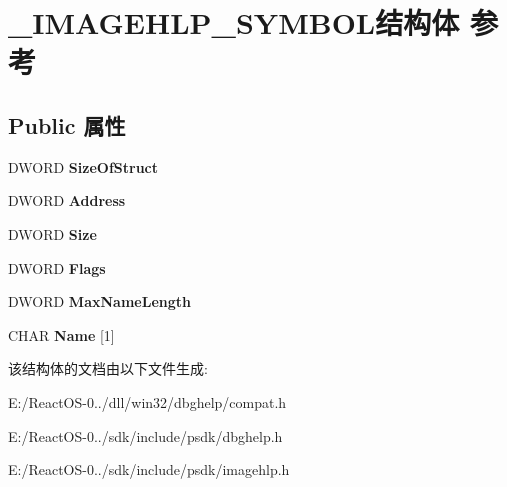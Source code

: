 \hypertarget{struct___i_m_a_g_e_h_l_p___s_y_m_b_o_l}{}\section{\+\_\+\+I\+M\+A\+G\+E\+H\+L\+P\+\_\+\+S\+Y\+M\+B\+O\+L结构体 参考}
\label{struct___i_m_a_g_e_h_l_p___s_y_m_b_o_l}
\subsection*{Public 属性}
\begin{DoxyCompactItemize}
\item 
\mbox{\label{struct___i_m_a_g_e_h_l_p___s_y_m_b_o_l_a34e4cee260d094b48f1c559def7e6b7d}} 
D\+W\+O\+RD {\bfseries Size\+Of\+Struct}
\item 
\mbox{\label{struct___i_m_a_g_e_h_l_p___s_y_m_b_o_l_a5c024291ea68d05b0ce732ef19c8dbb8}} 
D\+W\+O\+RD {\bfseries Address}
\item 
\mbox{\label{struct___i_m_a_g_e_h_l_p___s_y_m_b_o_l_a26bdc54ee7f6f31de76be163c3b78256}} 
D\+W\+O\+RD {\bfseries Size}
\item 
\mbox{\label{struct___i_m_a_g_e_h_l_p___s_y_m_b_o_l_ab5cc3cda6d865990ae9608ff4516ae09}} 
D\+W\+O\+RD {\bfseries Flags}
\item 
\mbox{\label{struct___i_m_a_g_e_h_l_p___s_y_m_b_o_l_a4dfe5c0638663f22e257e0802508b5f4}} 
D\+W\+O\+RD {\bfseries Max\+Name\+Length}
\item 
\mbox{\label{struct___i_m_a_g_e_h_l_p___s_y_m_b_o_l_af137ba810b2180056d4355ada787e002}} 
C\+H\+AR {\bfseries Name} \mbox{[}1\mbox{]}
\end{DoxyCompactItemize}


该结构体的文档由以下文件生成\+:\begin{DoxyCompactItemize}
\item 
E\+:/\+React\+O\+S-\/0../dll/win32/dbghelp/compat.\+h\item 
E\+:/\+React\+O\+S-\/0../sdk/include/psdk/dbghelp.\+h\item 
E\+:/\+React\+O\+S-\/0../sdk/include/psdk/imagehlp.\+h\end{DoxyCompactItemize}
